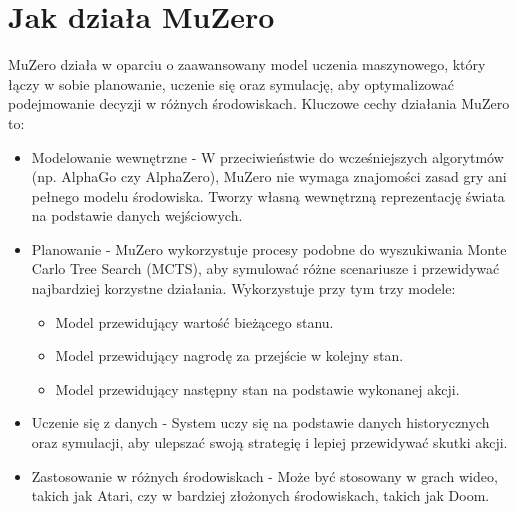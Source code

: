 \section{Jak działa MuZero}
  MuZero działa w oparciu o zaawansowany model uczenia maszynowego, który łączy w sobie planowanie, uczenie się oraz symulację, aby optymalizować podejmowanie decyzji w różnych środowiskach. Kluczowe cechy działania MuZero to:
  \begin{itemize}
    \item  Modelowanie wewnętrzne - W przeciwieństwie do wcześniejszych algorytmów (np. AlphaGo czy AlphaZero), MuZero nie wymaga znajomości zasad gry ani pełnego modelu środowiska. Tworzy własną wewnętrzną reprezentację świata na podstawie danych wejściowych.
    \item Planowanie - MuZero wykorzystuje procesy podobne do wyszukiwania Monte Carlo Tree Search (MCTS), aby symulować różne scenariusze i przewidywać najbardziej korzystne działania. Wykorzystuje przy tym trzy modele:
    \begin{itemize}
      \item Model przewidujący wartość bieżącego stanu.
      \item Model przewidujący nagrodę za przejście w kolejny stan.
      \item Model przewidujący następny stan na podstawie wykonanej akcji.
    \end{itemize}

    \item Uczenie się z danych - System uczy się na podstawie danych historycznych oraz symulacji, aby ulepszać swoją strategię i lepiej przewidywać skutki akcji.
    \item Zastosowanie w różnych środowiskach - Może być stosowany w grach wideo, takich jak Atari, czy w bardziej złożonych środowiskach, takich jak Doom.
  \end{itemize}
  